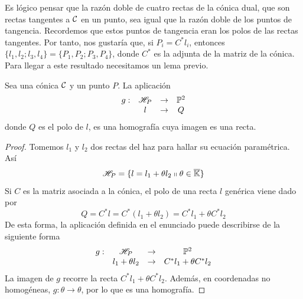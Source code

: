 Es lógico pensar que la razón doble de cuatro rectas de la cónica dual, que son rectas tangentes a $\mathcal{C}$ en un punto, sea igual que la razón doble de los puntos de tangencia. Recordemos que estos puntos de tangencia eran los polos de las rectas tangentes. Por tanto, nos gustaría que, si $P_i=C^*l_i$, entonces $\{l_1,l_2;l_3,l_4\}=\{P_1,P_2;P_3,P_4\}$, donde $C^*$ es la adjunta de la matriz de la cónica. Para llegar a este resultado necesitamos un lema previo.
\begin{lem}
	Sea una cónica $\mathcal{C}$ y un punto $P$. La aplicación
	\begin{equation}
		\begin{array}{cccc}
		g:&\mathscr{H}_P&\rightarrow &\mathbb{P}^2\\
		&l&\rightarrow & Q
		\end{array}
	\end{equation}
	donde $Q$ es el polo de $l$, es una homografía cuya imagen es una recta.
\end{lem}
\begin{proof}
	Tomemos $l_1$ y $l_2$ dos rectas del haz para hallar su ecuación paramétrica. Así
	\begin{equation*}
		\mathscr{H}_P=\{l=l_1+\theta l_2\shortparallel\theta\in\overline{\mathbb{K}}\}
	\end{equation*}
	Si $C$ es la matriz asociada a la cónica, el polo de una recta $l$ genérica viene dado por
	\begin{equation*}
		Q=C^*l=C^*(l_1+\theta l_2)=C^*l_1+\theta C^*l_2
	\end{equation*}
	De esta forma, la aplicación definida en el enunciado puede describirse de la siguiente forma
	\begin{equation*}
		\begin{array}{cccc}
		g:&\mathscr{H}_P&\rightarrow &\mathbb{P}^2\\
		&l_1+\theta l_2&\rightarrow & C^*l_1+\theta C^*l_2
		\end{array}
	\end{equation*}
	La imagen de $g$ recorre la recta $C^*l_1+\theta C^*l_2$. Además, en coordenadas no homogéneas, $g:\theta\rightarrow \theta$, por lo que es una homografía.
\end{proof}